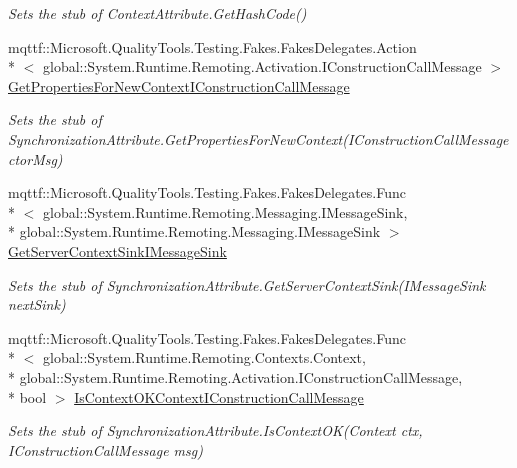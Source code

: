 \begin{DoxyCompactItemize}
\begin{DoxyCompactList}\small\item\em Sets the stub of Context\-Attribute.\-Get\-Hash\-Code()\end{DoxyCompactList}\item 
mqttf\-::\-Microsoft.\-Quality\-Tools.\-Testing.\-Fakes.\-Fakes\-Delegates.\-Action\\*
$<$ global\-::\-System.\-Runtime.\-Remoting.\-Activation.\-I\-Construction\-Call\-Message $>$ \hyperlink{class_system_1_1_runtime_1_1_remoting_1_1_contexts_1_1_fakes_1_1_stub_synchronization_attribute_a312c022d83c0be57951c69f565500279}{Get\-Properties\-For\-New\-Context\-I\-Construction\-Call\-Message}
\begin{DoxyCompactList}\small\item\em Sets the stub of Synchronization\-Attribute.\-Get\-Properties\-For\-New\-Context(\-I\-Construction\-Call\-Message ctor\-Msg)\end{DoxyCompactList}\item 
mqttf\-::\-Microsoft.\-Quality\-Tools.\-Testing.\-Fakes.\-Fakes\-Delegates.\-Func\\*
$<$ global\-::\-System.\-Runtime.\-Remoting.\-Messaging.\-I\-Message\-Sink, \\*
global\-::\-System.\-Runtime.\-Remoting.\-Messaging.\-I\-Message\-Sink $>$ \hyperlink{class_system_1_1_runtime_1_1_remoting_1_1_contexts_1_1_fakes_1_1_stub_synchronization_attribute_ad2abe79f97fcca9c263fda2bc29c4fd7}{Get\-Server\-Context\-Sink\-I\-Message\-Sink}
\begin{DoxyCompactList}\small\item\em Sets the stub of Synchronization\-Attribute.\-Get\-Server\-Context\-Sink(\-I\-Message\-Sink next\-Sink)\end{DoxyCompactList}\item 
mqttf\-::\-Microsoft.\-Quality\-Tools.\-Testing.\-Fakes.\-Fakes\-Delegates.\-Func\\*
$<$ global\-::\-System.\-Runtime.\-Remoting.\-Contexts.\-Context, \\*
global\-::\-System.\-Runtime.\-Remoting.\-Activation.\-I\-Construction\-Call\-Message, \\*
bool $>$ \hyperlink{class_system_1_1_runtime_1_1_remoting_1_1_contexts_1_1_fakes_1_1_stub_synchronization_attribute_ab176e13a9fd316e47f2aaa6c2d781b95}{Is\-Context\-O\-K\-Context\-I\-Construction\-Call\-Message}
\begin{DoxyCompactList}\small\item\em Sets the stub of Synchronization\-Attribute.\-Is\-Context\-O\-K(\-Context ctx, I\-Construction\-Call\-Message msg)\end{DoxyCompactList}\item 

\end{DoxyCompactItemize}
